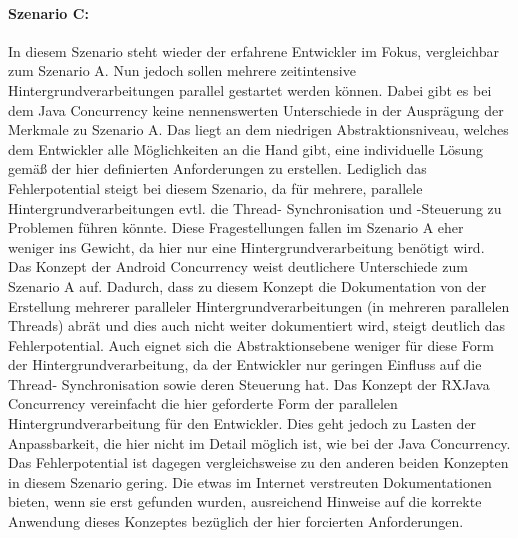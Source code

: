 \documentclass[12pt,oneside,a4paper,bibtotoc,liststotoc]{scrreprt}
\begin{document}
\paragraph{Szenario C:}
In diesem Szenario steht wieder der erfahrene Entwickler im Fokus, vergleichbar zum Szenario A. Nun jedoch sollen mehrere zeitintensive Hintergrundverarbeitungen parallel gestartet werden können. Dabei gibt es bei dem Java Concurrency keine nennenswerten Unterschiede in der Ausprägung der Merkmale zu Szenario A. Das liegt an dem niedrigen Abstraktionsniveau, welches dem Entwickler alle Möglichkeiten an die Hand gibt, eine individuelle Lösung gemäß der hier definierten Anforderungen zu erstellen. Lediglich das Fehlerpotential steigt bei diesem Szenario, da für mehrere, parallele Hintergrundverarbeitungen evtl. die Thread- Synchronisation und -Steuerung zu Problemen führen könnte. Diese Fragestellungen fallen im Szenario A eher weniger ins Gewicht, da hier nur eine Hintergrundverarbeitung benötigt wird.
Das Konzept der Android Concurrency weist deutlichere Unterschiede zum Szenario A auf. Dadurch, dass zu diesem Konzept die Dokumentation von der Erstellung mehrerer paralleler Hintergrundverarbeitungen (in mehreren parallelen Threads) abrät und dies auch nicht weiter dokumentiert wird, steigt deutlich das Fehlerpotential. Auch eignet sich die Abstraktionsebene weniger für diese Form der Hintergrundverarbeitung, da der Entwickler nur geringen Einfluss auf die Thread- Synchronisation sowie deren Steuerung hat.
Das Konzept der RXJava Concurrency vereinfacht die hier geforderte Form der parallelen Hintergrundverarbeitung für den Entwickler. Dies geht jedoch zu Lasten der Anpassbarkeit, die hier nicht im Detail möglich ist, wie bei der Java Concurrency. Das Fehlerpotential ist dagegen vergleichsweise zu den anderen beiden Konzepten in diesem Szenario gering. Die etwas im Internet verstreuten Dokumentationen bieten, wenn sie erst gefunden wurden, ausreichend Hinweise auf die korrekte Anwendung dieses Konzeptes bezüglich der hier forcierten Anforderungen.\newline
\end{document}
